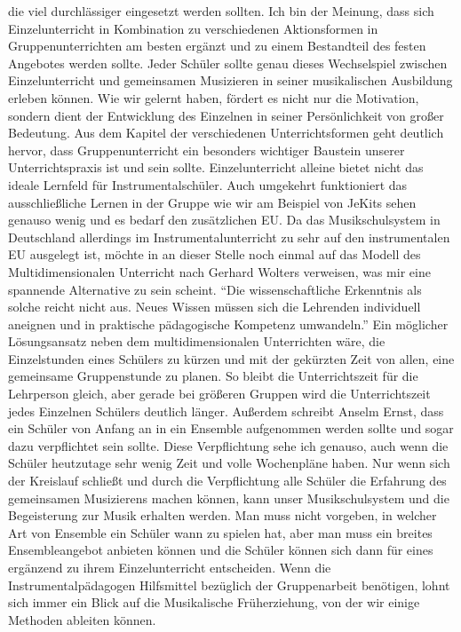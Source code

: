 die viel durchlässiger eingesetzt werden sollten. Ich bin der Meinung, dass sich
Einzelunterricht in Kombination zu verschiedenen Aktionsformen in
Gruppenunterrichten am besten ergänzt und zu einem Bestandteil des festen
Angebotes werden sollte. Jeder Schüler sollte genau dieses Wechselspiel zwischen
Einzelunterricht und gemeinsamen Musizieren in seiner musikalischen Ausbildung
erleben können. Wie wir gelernt haben, fördert es nicht nur die Motivation,
sondern dient der Entwicklung des Einzelnen in seiner Persönlichkeit von
großer Bedeutung. Aus dem Kapitel der verschiedenen Unterrichtsformen geht
deutlich hervor, dass Gruppenunterricht ein besonders wichtiger Baustein unserer
Unterrichtspraxis ist und sein sollte. Einzelunterricht alleine bietet nicht das
ideale Lernfeld für Instrumentalschüler. Auch umgekehrt funktioniert das
ausschließliche Lernen in der Gruppe wie wir am Beispiel von JeKits sehen genauso
wenig und es bedarf den zusätzlichen EU. Da das Musikschulsystem in Deutschland
allerdings im Instrumentalunterricht zu sehr auf den instrumentalen EU ausgelegt
ist, möchte in an dieser Stelle noch einmal auf das Modell des
Multidimensionalen Unterricht nach Gerhard Wolters verweisen, was mir eine
spannende Alternative zu sein scheint.
\enquote{Die wissenschaftliche Erkenntnis als solche reicht nicht aus. Neues
Wissen müssen sich die Lehrenden individuell aneignen und in praktische
pädagogische Kompetenz umwandeln.}
\autocite[10]{losert:die_kunst_zu_unterrichten} Ein möglicher Lösungsansatz
neben dem multidimensionalen Unterrichten wäre, die Einzelstunden eines Schülers
zu kürzen und mit der gekürzten Zeit von allen, eine gemeinsame Gruppenstunde zu
planen. So bleibt die Unterrichtszeit für die Lehrperson gleich, aber gerade bei
größeren Gruppen wird die Unterrichtszeit jedes Einzelnen Schülers deutlich
länger.\autocite[33]{losert:die_kunst_zu_unterrichten} Außerdem schreibt Anselm
Ernst, dass ein Schüler von Anfang an in ein Ensemble aufgenommen werden sollte
und sogar dazu verpflichtet sein sollte.
\autocite[61]{ernst:die_zukunftsfaehige_musikschule} Diese Verpflichtung sehe
ich genauso, auch wenn die Schüler heutzutage sehr wenig Zeit und volle
Wochenpläne haben. Nur wenn sich der Kreislauf schließt und durch die
Verpflichtung alle Schüler die Erfahrung des gemeinsamen Musizierens machen
können, kann unser Musikschulsystem und die Begeisterung zur Musik erhalten werden. Man
muss nicht vorgeben, in welcher Art von Ensemble ein Schüler wann zu spielen
hat, aber man muss ein breites Ensembleangebot anbieten können und die Schüler
können sich dann für eines ergänzend zu ihrem Einzelunterricht entscheiden. Wenn
die Instrumentalpädagogen Hilfsmittel bezüglich der Gruppenarbeit benötigen,
lohnt sich immer ein Blick auf die Musikalische Früherziehung, von der wir
einige Methoden ableiten können. 

